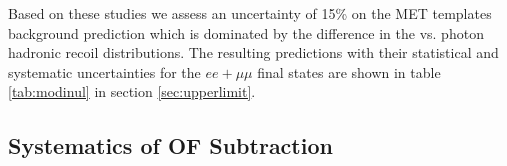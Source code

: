\newcommand{\systpercentage}{15\% }

Based on these studies we assess an uncertainty of \systpercentage
on the MET templates background prediction
which is dominated by the difference in the \Z vs. photon hadronic recoil \pt distributions.
The resulting predictions with their statistical and systematic uncertainties for the $ee+\mu\mu$ 
final states are shown in table \ref{tab:modinul} in section \ref{sec:upperlimit}.

\subsection{Systematics of OF Subtraction}
\label{sec:systematicsof}

\newcommand{\ofsystpercentage}{9\% }

